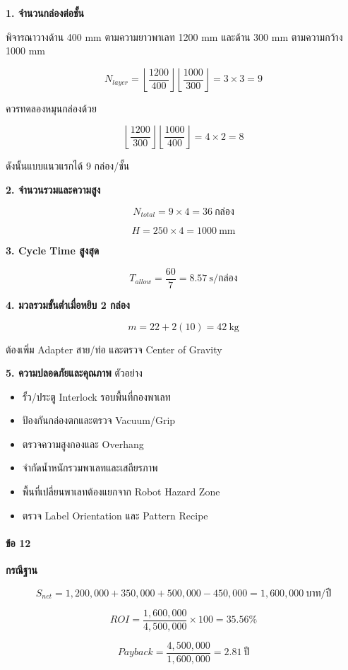 \textbf{1. จำนวนกล่องต่อชั้น}

พิจารณาวางด้าน 400 mm ตามความยาวพาเลท 1200 mm และด้าน 300 mm ตามความกว้าง 1000 mm

\[
N_{layer}=\left\lfloor\frac{1200}{400}\right\rfloor
\left\lfloor\frac{1000}{300}\right\rfloor=3\times3=9
\]

ควรทดลองหมุนกล่องด้วย

\[
\left\lfloor\frac{1200}{300}\right\rfloor
\left\lfloor\frac{1000}{400}\right\rfloor=4\times2=8
\]

ดังนั้นแบบแนวแรกได้ 9 กล่อง/ชั้น

\textbf{2. จำนวนรวมและความสูง}

\[
N_{total}=9\times4=36\ \text{กล่อง}
\]

\[
H=250\times4=1000\ \text{mm}
\]

\textbf{3. Cycle Time สูงสุด}

\[
T_{allow}=\frac{60}{7}=8.57\ \text{s/กล่อง}
\]

\textbf{4. มวลรวมขั้นต่ำเมื่อหยิบ 2 กล่อง}

\[
m=22+2(10)=42\ \text{kg}
\]

ต้องเพิ่ม Adapter สาย/ท่อ และตรวจ Center of Gravity

\textbf{5. ความปลอดภัยและคุณภาพ} ตัวอย่าง

\begin{itemize}
    \item รั้ว/ประตู Interlock รอบพื้นที่กองพาเลท
    \item ป้องกันกล่องตกและตรวจ Vacuum/Grip
    \item ตรวจความสูงกองและ Overhang
    \item จำกัดน้ำหนักรวมพาเลทและเสถียรภาพ
    \item พื้นที่เปลี่ยนพาเลทต้องแยกจาก Robot Hazard Zone
    \item ตรวจ Label Orientation และ Pattern Recipe
\end{itemize}

\paragraph{ข้อ 12}

\textbf{กรณีฐาน}

\[
S_{net}=1{,}200{,}000+350{,}000+500{,}000-450{,}000
=1{,}600{,}000\ \text{บาท/ปี}
\]

\[
ROI=\frac{1{,}600{,}000}{4{,}500{,}000}\times100=35.56\%
\]

\[
Payback=\frac{4{,}500{,}000}{1{,}600{,}000}=2.81\ \text{ปี}
\]

